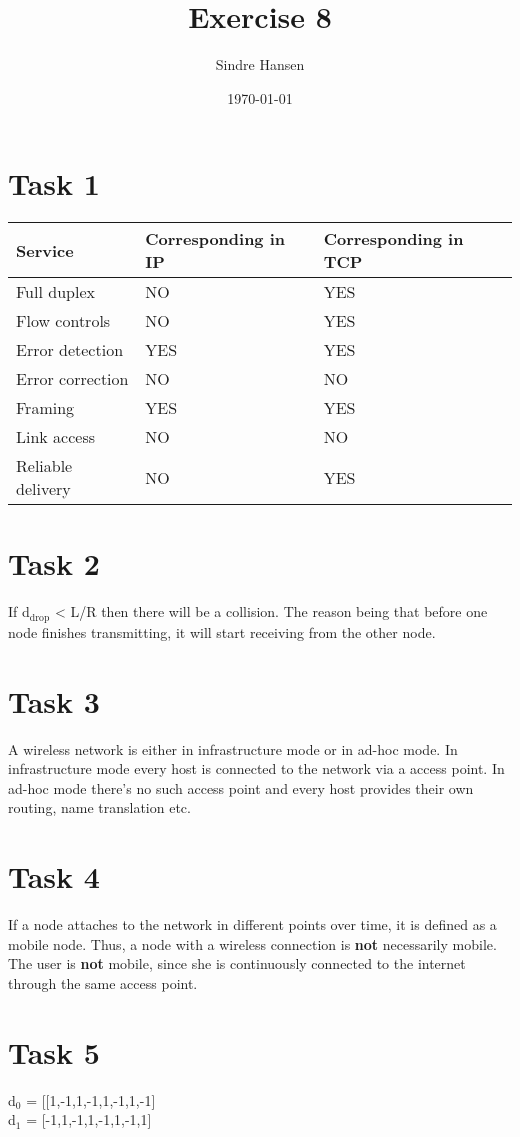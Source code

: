 \documentclass[11pt]{article}
\author{Sindre Hansen}
\date{\today}
\title{Exercise 8}
\begin{document}
\maketitle

\section{Task 1}
\label{sec-1}
\begin{center}
\begin{tabular}{lll}
Service & Corresponding in IP & Corresponding in TCP\\
\hline
Full duplex & NO & YES\\
Flow controls & NO & YES\\
Error detection & YES & YES\\
Error correction & NO & NO\\
Framing & YES & YES\\
Link access & NO & NO\\
Reliable delivery & NO & YES\\
\end{tabular}
\end{center}

\section{Task 2}
\label{sec-2}
If d$_{\text{drop}}$ < L/R then there will be a collision. The reason being that before one node finishes transmitting, it will start receiving from the other node.
\section{Task 3}
\label{sec-3}
A wireless network is either in infrastructure mode or in ad-hoc mode. In infrastructure mode every host is connected to the network via a access point. In ad-hoc mode there's no such access point and every host provides their own routing, name translation etc.
\section{Task 4}
\label{sec-4}
If a node attaches to the network in different points over time, it is defined as a mobile node. Thus, a node with a wireless connection is \textbf{not} necessarily mobile. The user is \textbf{not} mobile, since she is continuously connected to the internet through the same access point.

\section{Task 5}
\label{sec-5}
d$_{\text{0}}$ = [[1,-1,1,-1,1,-1,1,-1]\\
d$_{\text{1}}$ = [-1,1,-1,1,-1,1,-1,1]
\end{document}
